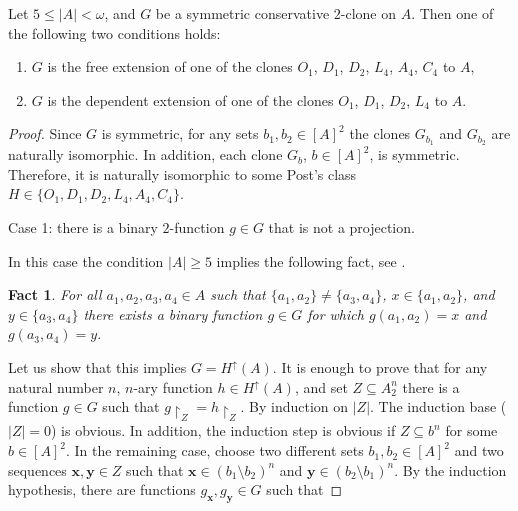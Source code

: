 \documentclass[graybox]{SNmult}
\newtheorem{fact}{Fact}
\theoremstyle{definition}
\begin{document}
\begin{theorem}\label{Th2_clone}
	Let $5\leq |A|<\omega$, and $G$ be a symmetric conservative $2$-clone on $A$. Then one of the following two conditions holds:
	\begin{enumerate}
		\item\label{cond1} $G$ is the free extension of one of the clones $O_1$, $D_1$, $D_2$, $L_4$, $A_4$, $C_4$ to $A$,
		\item\label{cond2} $G$ is the dependent extension of one of the clones $O_1$, $D_1$, $D_2$, $L_4$ to $A$.
	\end{enumerate}
\end{theorem}
\begin{proof} Since $G$ is symmetric, for any sets $b_1, b_2\in [A]^2$ the clones $G_{b_1}$ and $G_{b_2}$ are naturally isomorphic. In addition, each clone $G_b$, $b\in [A]^2$, is symmetric. Therefore, it is naturally isomorphic to some Post's class $H\in\{O_1, D_1, D_2, L_4, A_4, C_4\}$. 
	\par Case 1: there is a binary $2$-function $g\in G$ that is not a projection. 
	\par In this case the condition $|A|\geq 5$ implies the following fact, see \cite{Shelah}.
	\begin{fact}\label{fact1}
		For all $a_1, a_2, a_3, a_4\in A$ such that $\{a_1, a_2\}\neq \{a_3, a_4\}$, $x\in \{a_1, a_2\}$, and $y\in \{a_3, a_4\}$ there exists a binary function $g\in G$ for which $g(a_1, a_2)=x$ and $g(a_3, a_4)=y$. %
	\end{fact}
	Let us show that this implies $G=H^\uparrow(A)$. It is enough to prove that for any natural number $n$, $n$-ary function $h\in H^\uparrow(A)$, and set $Z\subseteq A^n_2$ there is a function $g\in G$ such that $g\restriction_Z=h\restriction_Z$. By induction on $|Z|$. The induction base ($|Z|=0$) is obvious. In addition, the induction step is obvious if $Z\subseteq b^n$ for some $b\in [A]^2$. In the remaining case, choose two different sets $b_1, b_2\in [A]^2$ and two sequences $\bm x, \bm y\in Z$ such that $\bm x\in (b_1\setminus b_2)^n$ and $\bm y\in (b_2\setminus b_1)^n$. By the induction hypothesis, there are functions $g_{\bm x}, g_{\bm y}\in G$ such that 

\end{proof}
\end{document}
